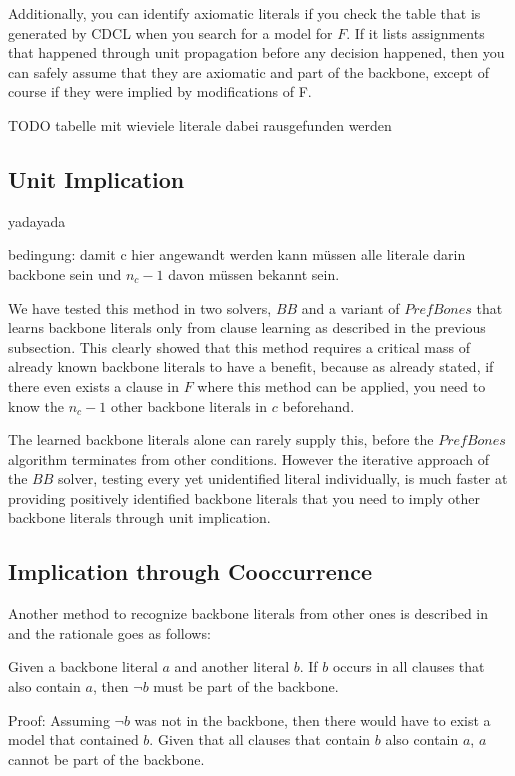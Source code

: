 Additionally, you can identify axiomatic literals if you check the table that is generated by CDCL when you search for a model for $F$. If it lists assignments that happened through unit propagation before any decision happened, then you can safely assume that they are axiomatic and part of the backbone, except of course if they were implied by modifications of F.

TODO tabelle mit wieviele literale dabei rausgefunden werden

\fi
\subsection{Unit Implication}
\label{subsec:unitImpl}

yadayada

bedingung: damit c hier angewandt werden kann müssen alle literale darin backbone sein und $n_c - 1$ davon müssen bekannt sein.


We have tested this method in two solvers, $BB$ and a variant of $PrefBones$ that learns backbone literals only from clause learning as described in the previous subsection. This clearly showed that this method requires a critical mass of already known backbone literals to have a benefit, because as already stated, if there even exists a clause in $F$ where this method can be applied, you need to know the $n_c - 1$ other backbone literals in $c$ beforehand.

The learned backbone literals alone can rarely supply this, before the $PrefBones$ algorithm terminates from other conditions. However the iterative approach of the $BB$ solver, testing every yet unidentified literal individually, is much faster at providing positively identified backbone literals that you need to imply other backbone literals through unit implication.

\subsection{Implication through Cooccurrence}
\label{subsec:coocc}
Another method to recognize backbone literals from other ones is described in \cite{wbxcl16} and the rationale goes as follows:
\begin{lemma}
Given a backbone literal $a$ and another literal $b$. If $b$ occurs in all clauses that also contain $a$, then $\neg b$ must be part of the backbone. 

Proof: Assuming $\neg b$ was not in the backbone, then there would have to exist a model that contained $b$. Given that all clauses that contain $b$ also contain $a$, $a$ cannot be part of the backbone.
\end{lemma}


